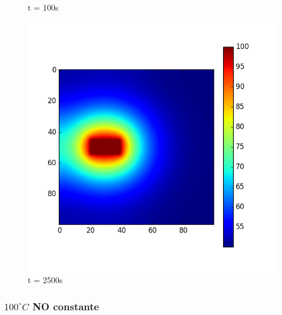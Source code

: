 \documentclass{article}
\begin{document}
\begin{figure}[H]
  \caption{t = 100s}\label{fig:awesome_image2}
\endminipage\hfill
{}%
  \includegraphics[width=\linewidth]{abiertasCte2500.png}
  \caption{t = 2500s}\label{fig:awesome_image3}
\endminipage
\end{figure}



\subsubsection{$100^\circ C$ NO constante}
\end{document}
